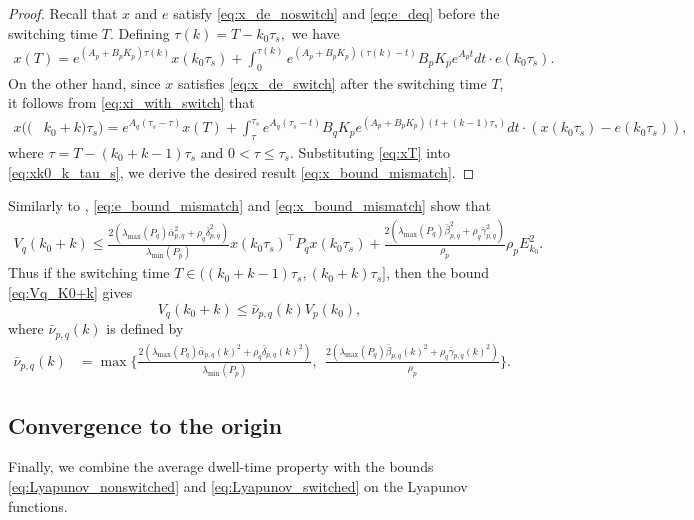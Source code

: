 \documentclass[letterpaper, 11pt, onecolumn]{ieeeconf}  \IEEEoverridecommandlockouts
\begin{document}
\begin{proof}
Recall that $x$ and $e$ satisfy \eqref{eq:x_de_noswitch} 
and \eqref{eq:e_deq}
before the switching time $T$.
Defining 
$
\tau(k) = T - k_0\tau_s,
$
we have
\begin{align}
\label{eq:xT}
x(T)
=
e^{(A_p+B_pK_p)\tau(k)} x(k_0\tau_s) +\int^{\tau(k)}_{0}
e^{(A_p+B_pK_p)(\tau(k) - t)}
B_pK_p e^{A_p t} dt \cdot
e(k_0\tau_s). 
\end{align}
On the other hand, 
since 
$x$ satisfies \eqref{eq:x_de_switch}
after the switching time $T$, it follows from \eqref{eq:xi_with_switch} that
\begin{align}
x((&k_0+k)\tau_s) 
=
e^{A_q(\tau_s - \tau)} x(T) +
\int^{\tau_s }_{\tau}
e^{A_q(\tau_s  - t)}
B_qK_p e^{(A_p+B_pK_p) (t +(k-1)\tau_s)} dt  \cdot
(x(k_0\tau_s) - e(k_0\tau_s)), \label{eq:xk0_k_tau_s}
\end{align}
where $\tau = T - (k_0 + k-1)\tau_s$ and $0 < \tau \leq \tau_s$.
Substituting \eqref{eq:xT} into \eqref{eq:xk0_k_tau_s},
we derive the desired result \eqref{eq:x_bound_mismatch}.
\end{proof}

Similarly to \cite[Lemma 2]{Liberzon2014}, 
\eqref{eq:e_bound_mismatch} and \eqref{eq:x_bound_mismatch} 
show that
\begin{align}
V_q(k_0+k) 
\leq
\frac{
2(\lambda_{\max}(P_q) \bar \alpha_{p,q}^2 +
\rho_q \bar \delta_{p,q}^2 )}{\lambda_{\min}(P_p)}
x(k_0\tau_s)^{\top}P_q x(k_0\tau_s) +
\frac{2(\lambda_{\max}(P_q)\bar \beta_{p,q}^2
+ \rho_q  \bar \gamma_{p,q}^2) }{\rho_p}
\rho_p E_{k_0}^2. \label{eq:Vq_K0+k}
\end{align}
Thus if the switching time $T \in ((k_0+k-1)\tau_s,(k_0+k)\tau_s ]$,
then the bound \eqref{eq:Vq_K0+k} gives
\begin{equation}
\label{eq:Lyapunov_switched}
V_q(k_0+k) \leq \bar \nu_{p,q}(k) V_p(k_0),
\end{equation}
where $\bar \nu_{p,q}(k)$ is defined by
\begin{align*}
\bar \nu_{p,q}(k) &= 
\max
\biggl\{
\frac{
2(\lambda_{\max}(P_q) \bar \alpha_{p,q}(k)^2 +
\rho_q \bar \delta_{p,q}(k)^2) }{\lambda_{\min}(P_p)},~~
\frac{2(\lambda_{\max}(P_q)\bar \beta_{p,q}(k)^2
+ \rho_q  \bar \gamma_{p,q}(k)^2) }{\rho_p}
\biggr\}.
\end{align*}




\subsection{Convergence to the origin}
Finally, we combine 
the average dwell-time property with
the bounds \eqref{eq:Lyapunov_nonswitched} 
and \eqref{eq:Lyapunov_switched} on the Lyapunov functions.
\end{document}
